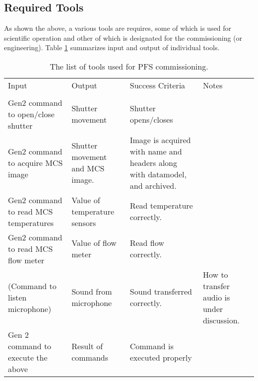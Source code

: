 \subsection{Required Tools}\label{sec:required_tools}
As shown the above, a various tools are requires, some of which is used for scientific operation and other of which is designated for the commissioning (or engineering).
Table \ref{tbl:tools} summarizes input and output of individual tools.



\begin{longtable}{p{40mm}|p{40mm}|p{40mm}|p{35mm}}
\caption{
The list of tools used for PFS commissioning.}
\label{tbl:tools} 
\footnotesize
\\ \hline
Input	& Output & Success Criteria & Notes \\ \hline \hline
\endhead
\endfoot
\multicolumn{4}{c}{ \ref{secflow:MCSoff} and \ref{secflow:MCSon}: Initial check of MCS} \\ \hline
Gen2 command to open/close shutter 	&  Shutter movement	& Shutter opens/closes	&  	\\  \hline
Gen2 command to acquire MCS image 	&  Shutter movement and MCS image.	& Image is acquired with name and headers along with datamodel, and archived. &  \\  \hline
Gen2 command to read MCS temperatures 	&  Value of temperature sensors 	& Read temperature correctly.	&  \\  \hline
Gen2 command to read MCS flow meter 	&  Value of flow meter	& Read flow correctly.	&  \\  \hline
(Command to listen microphone) 	&  Sound from microphone	& Sound transferred correctly.	& How to transfer audio is under discussion.  \\  \hline
Gen 2 command to execute the above 	&  Result of commands	& Command is executed properly	&  	\\ \hline
\end{longtable}
